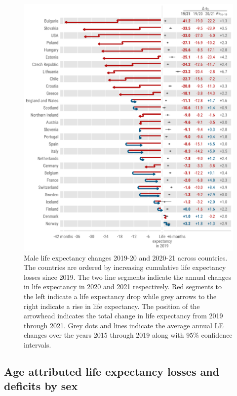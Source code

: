 \documentclass[12pt]{article}
\begin{document}
\begin{figure}[hb!]
    \centering
    \includegraphics{figure-a5.pdf}
    \caption{Male life expectancy changes 2019-20 and 2020-21 across countries. The countries are ordered by increasing cumulative life expectancy losses since 2019.  The two line segments indicate the annual changes in life expectancy in 2020 and 2021 respectively. Red segments to the left indicate a life expectancy drop while grey arrows to the right indicate a rise in life expectancy. The position of the arrowhead indicates the total change in life expectancy from 2019 through 2021.
    Grey dots and lines indicate the average annual LE changes over the years 2015 through 2019 along with 95\% confidence intervals.}
    \label{fig:figure-a5}
\end{figure}

\clearpage

\subsection*{Age attributed life expectancy losses and deficits by sex}
\end{document}
